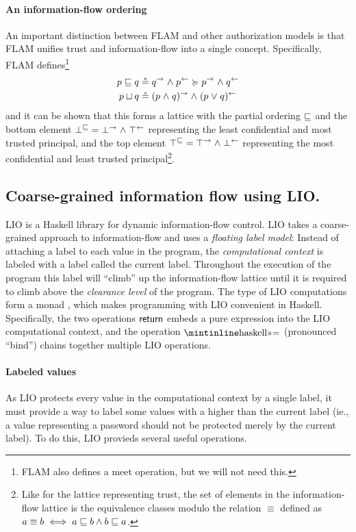 \paragraph{An information-flow ordering}
An important distinction between FLAM and other authorization models is that FLAM unifies trust and information-flow into a single concept. Specifically, FLAM defines\footnote{FLAM also defines a meet operation, but we will not need this.}
\begin{align*}
p \sqsubseteq q &\circeq q^{\rightarrow} \mathrel{\land} p^{\leftarrow} \succcurlyeq p^{\rightarrow} \mathrel{\land} q^{\leftarrow}\\
p \sqcup q &\circeq (p \mathrel{\land} q)^{\rightarrow} \mathrel{\land} (p \mathrel{\lor} q)^{\leftarrow}
\end{align*}
and it can be shown that this forms a lattice with the partial ordering $\sqsubseteq$ and the bottom element $\bot^{\sqsubseteq} = \bot^{\rightarrow} \mathrel{\land} \top^{\leftarrow}$ representing the least confidential and most trusted principal, and the top element $\top^{\sqsubseteq} = \top^{\rightarrow} \mathrel{\land} \bot^{\leftarrow}$ representing the most confidential and least trusted principal\footnote{Like for the lattice representing trust, the set of elements in the information-flow lattice is the equivalence classes modulo the relation $\equiv$ defined as $a \equiv b \iff a \sqsubseteq b \wedge b \sqsubseteq a$.}.

\subsection{Coarse-grained information flow using LIO.}
LIO \cite{SRMMlio} is a Haskell library for dynamic information-flow control. LIO takes a coarse-grained approach to information-flow and uses a \emph{floating label model}: Instead of attaching a label to each value in the program, the \emph{computational context} is labeled with a label called the current label. Throughout the execution of the program this label will ``climb'' up the information-flow lattice until it is required to climb above the \emph{clearance level} of the program. The type of LIO computations form a monad \cite{Wadler:1995:MFP:647698.734146}, which makes programming with LIO convenient in Haskell. Specifically, the two operations $\mathsf{return}$ embeds a pure expression into the LIO computational context, and the operation $\bindop$ (pronounced ``bind'') chains together multiple LIO operations.

\paragraph{Labeled values}
As LIO protects every value in the computational context by a single label, it must provide a way to label some values with a higher than the current label (ie., a value representing a password should not be protected merely by the current label). To do this, LIO provieds several useful operations.

